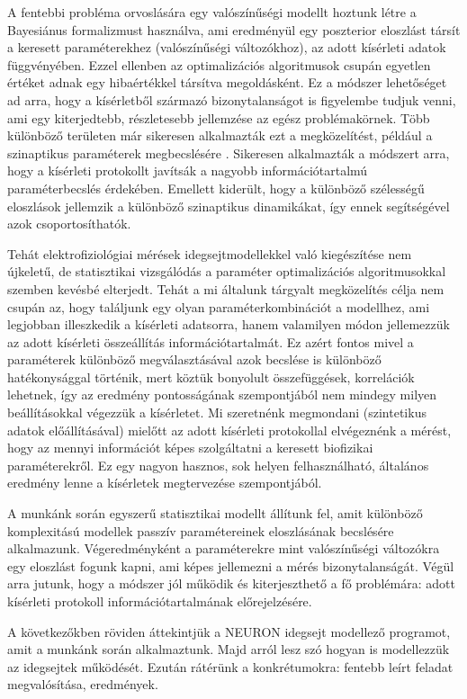 A fentebbi probléma orvoslására egy valószínűségi modellt hoztunk létre a Bayesiánus formalizmust használva, ami eredményül egy poszterior eloszlást társít a keresett paraméterekhez (valószínűségi változókhoz), az adott kísérleti adatok függvényében. Ezzel ellenben az optimalizációs algoritmusok csupán egyetlen értéket adnak egy hibaértékkel társítva megoldásként. Ez a módszer lehetőséget ad arra, hogy a kísérletből származó bizonytalanságot is figyelembe tudjuk venni, ami egy kiterjedtebb, részletesebb jellemzése az egész problémakörnek. Több különböző területen már sikeresen alkalmazták ezt a megközelítést, például a szinaptikus paraméterek megbecslésére \cite{costa2013probabilistic}. Sikeresen alkalmazták a módszert arra, hogy a kísérleti protokollt javítsák a nagyobb információtartalmú paraméterbecslés érdekében. Emellett kiderült, hogy a különböző szélességű eloszlások jellemzik a különböző szinaptikus dinamikákat, így ennek segítségével azok csoportosíthatók. 


Tehát elektrofiziológiai mérések idegsejtmodellekkel való kiegészítése nem újkeletű, de statisztikai vizsgálódás a paraméter optimalizációs algoritmusokkal szemben kevésbé elterjedt. Tehát a mi általunk tárgyalt megközelítés célja nem csupán az, hogy találjunk egy olyan paraméterkombinációt a modellhez, ami legjobban illeszkedik a kísérleti adatsorra, hanem valamilyen módon jellemezzük az adott kísérleti összeállítás információtartalmát. Ez azért fontos mivel a paraméterek különböző megválasztásával azok becslése is különböző hatékonysággal történik, mert köztük bonyolult összefüggések, korrelációk lehetnek, így az eredmény pontosságának szempontjából nem mindegy milyen beállításokkal végezzük a kísérletet. Mi szeretnénk megmondani (szintetikus adatok előállításával) mielőtt az adott kísérleti protokollal elvégeznénk a mérést, hogy az mennyi információt képes szolgáltatni a keresett biofizikai paraméterekről. Ez egy nagyon hasznos, sok helyen felhasználható, általános eredmény lenne a kísérletek megtervezése szempontjából.


A munkánk során egyszerű statisztikai modellt állítunk fel, amit különböző komplexitású modellek passzív paramétereinek eloszlásának becslésére alkalmazunk. Végeredményként a paraméterekre mint valószínűségi változókra egy eloszlást fogunk kapni, ami képes jellemezni a mérés bizonytalanságát. Végül arra jutunk, hogy a módszer jól működik és kiterjeszthető a fő problémára: adott kísérleti protokoll információtartalmának előrejelzésére.


A következőkben röviden áttekintjük a NEURON idegsejt modellező programot, amit a munkánk során alkalmaztunk. Majd arról lesz szó hogyan is modellezzük az idegsejtek működését. Ezután rátérünk a konkrétumokra: fentebb leírt feladat megvalósítása, eredmények.



